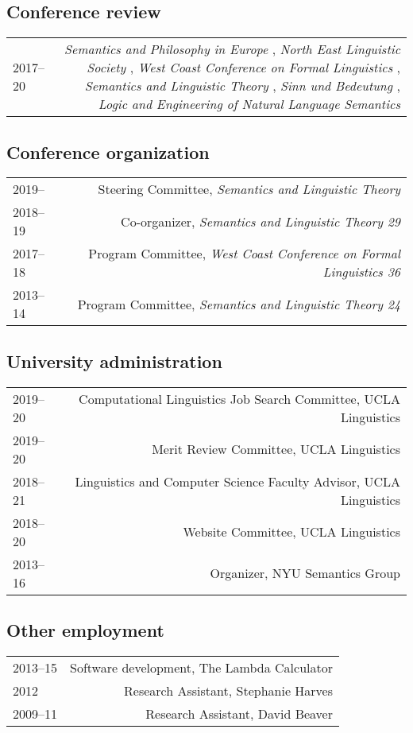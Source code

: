 \documentclass[12pt]{article}
\begin{document}
\subsection*{Conference review}

\begin{longtable}{LR}
  2017--20 &
    \textit{Semantics and Philosophy in Europe}%
    ,
    \textit{North East Linguistic Society}%
    ,
    \textit{West Coast Conference on Formal Linguistics}%
    ,
    \textit{Semantics and Linguistic Theory}%
    ,
    \textit{Sinn und Bedeutung}%
    ,
    \textit{Logic and Engineering of Natural Language Semantics}%
\end{longtable}

\subsection*{Conference organization}

\begin{longtable}{LR}
  2019--     & Steering Committee, \textit{Semantics and Linguistic Theory}\\
  2018--19   & Co-organizer, \textit{Semantics and Linguistic Theory 29}\\
  2017--18   & Program Committee, \textit{West Coast Conference on Formal
               Linguistics 36}\\
  2013--14   & Program Committee, \textit{Semantics and Linguistic Theory 24}
\end{longtable}

\subsection*{University administration}

\begin{longtable}{LR}
  2019--20   & Computational Linguistics Job Search Committee, UCLA Linguistics\\
  2019--20   & Merit Review Committee, UCLA Linguistics\\
  2018--21   & Linguistics and Computer Science Faculty Advisor, UCLA Linguistics\\
  2018--20   & Website Committee, UCLA Linguistics\\
  2013--16   & Organizer, NYU Semantics Group
\end{longtable}

\subsection*{Other employment}
\begin{longtable}{LR}
  2013--15   & Software development, The Lambda Calculator
               \\
  2012       & Research Assistant, Stephanie Harves\\
  2009--11   & Research Assistant, David Beaver
\end{longtable}
\end{document}
